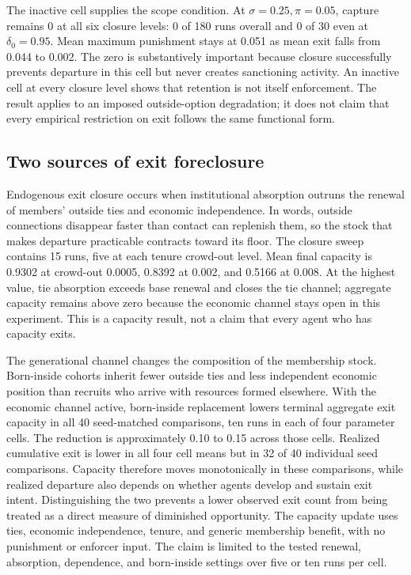 \documentclass[12pt]{article}
\begin{document}
The inactive cell supplies the scope condition. At \(\sigma=0.25,\pi=0.05\), capture remains 0
at all six closure levels: 0 of 180 runs overall and 0 of 30 even at \(\delta_0=0.95\). Mean
maximum punishment stays at 0.051 as mean exit falls from 0.044 to 0.002. The zero is
substantively important because closure successfully prevents departure in this cell but never
creates sanctioning activity. An inactive cell at every closure level shows that retention is
not itself enforcement. The result applies to an imposed outside-option degradation; it does not
claim that every empirical restriction on exit follows the same functional form.

\subsection{Two sources of exit foreclosure}

Endogenous exit closure occurs when institutional absorption outruns the renewal of members'
outside ties and economic independence. In words, outside connections disappear faster than
contact can replenish them, so the stock that makes departure practicable contracts toward its
floor. The closure sweep contains 15 runs, five at each tenure crowd-out level. Mean final
capacity is 0.9302 at crowd-out 0.0005, 0.8392 at 0.002, and 0.5166 at 0.008. At the highest
value, tie absorption exceeds base renewal and closes the tie channel; aggregate capacity
remains above zero because the economic channel stays open in this experiment. This is a
capacity result, not a claim that every agent who has capacity exits.

The generational channel changes the composition of the membership stock. Born-inside cohorts
inherit fewer outside ties and less independent economic position than recruits who arrive with
resources formed elsewhere. With the economic channel active, born-inside replacement lowers
terminal aggregate exit capacity in all 40 seed-matched comparisons, ten runs in each of four
parameter cells. The reduction is approximately 0.10 to 0.15 across those cells. Realized
cumulative exit is lower in all four cell means but in 32 of 40 individual seed comparisons.
Capacity therefore moves monotonically in these comparisons, while realized departure also
depends on whether agents develop and sustain exit intent. Distinguishing the two prevents a
lower observed exit count from being treated as a direct measure of diminished opportunity. The
capacity update uses ties, economic independence, tenure, and generic membership benefit, with
no punishment or enforcer input. The claim is limited to the tested renewal, absorption,
dependence, and born-inside settings over five or ten runs per cell.
\end{document}
